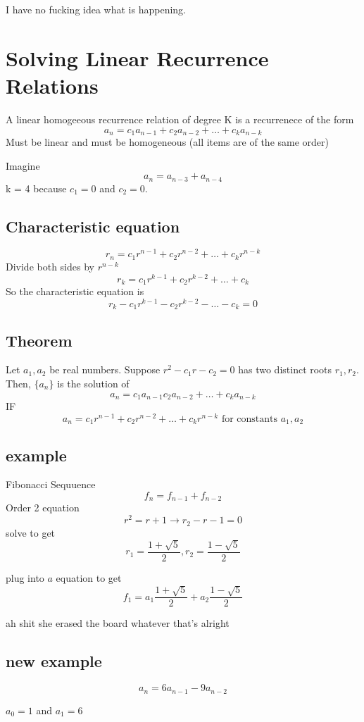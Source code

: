 \documentclass{report}
\begin{document}
I have no fucking idea what is happening.


\chapter{Solving Linear Recurrence Relations}
A linear homogeeous recurrence relation of degree K is a recurrenece of the form
\[
a_n = c_1a_{n-1}
+
c_2a_{n-2} +
\ldots +
c_ka_{n-k}
\]
Must be linear and must be homogeneous (all items are of the same order)

Imagine
\[
a_n = a_{n-3} + a_{n-4}
\]
k = 4 because $c_1 = 0$ and $c_2 = 0$.

\section{Characteristic equation}
\[
r_n = 
c_1r^{n-1} + 
c_2r^{n-2} + 
\ldots + 
c_kr^{n-k}
\]
Divide both sides by $r^{n-k}$
\[
r_k = 
c_1r^{k-1} + 
c_2r^{k-2} + 
\ldots + 
c_k
\]
So the characteristic equation is 
\[
r_k - 
c_1r^{k-1} -
c_2r^{k-2} -
\ldots -
c_k
=
0
\]

\section{Theorem}
Let $a_1, a_2$ be real numbers. Suppose $r^2 - c_1r - c_2 = 0$ 
has two distinct roots $r_1, r_2$. Then, $\{ a_n \}$ is the solution of
\[
a_n = c_1a_{n-1}
c_2a_{n-2} +
\ldots +
c_ka_{n-k}
\]
IF
\[
a_n = 
c_1r^{n-1} + 
c_2r^{n-2} + 
\ldots + 
c_kr^{n-k}
\textrm { for constants $a_1, a_2$}
\]



\section{example}
Fibonacci Sequuence
\[
f_n = f_{n-1} + f_{n-2}
\]
Order 2 equation
\[
r^2 = r + 1
\rightarrow
r_2 - r - 1 = 0
\]
solve to get
\[
r_1 = \frac{1 + \sqrt{5}}{2},
r_2 = \frac{1 - \sqrt{5}}{2}
\]

plug into $a$ equation to get
\[
f_1 = a_1 \frac{1 + \sqrt{5}}{2} + a_2 \frac{1 - \sqrt{5}}{2}
\]

ah shit she erased the board whatever that's alright


\section{new example}
\[
a_n = 6a_{n-1} - 9 a_{n-2}
\]

$a_0 = 1$ and $a_1 = 6$
\end{document}
